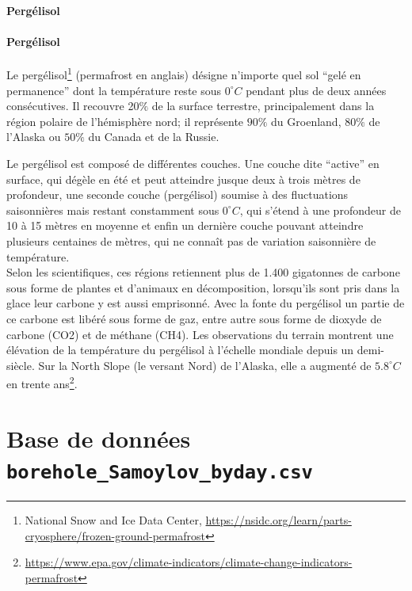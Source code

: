 \documentclass[a4paper,12pt]{article}
\theoremstyle{exercice}
\newcommand{\feuille}[2]{

\begin{bfseries}
\noindent Pergélisol \hfill   \\
 \hfill \\[10pt]
\end{bfseries}


\vspace{0.2cm}

\hrule\vspace{\baselineskip}

 }
\begin{document}
\thispagestyle{empty}


\begin{center}
\Large{\textbf{Pergélisol}}
\end{center}


\vspace{1cm}



\paragraph{Pergélisol}
Le pergélisol\footnote{National Snow and Ice Data Center, \url{https://nsidc.org/learn/parts-cryosphere/frozen-ground-permafrost} } (permafrost en anglais) désigne n'importe quel sol ``gelé en permanence'' dont la température reste sous $0^{\circ}C$ pendant plus de deux années consécutives. Il recouvre 20$\%$ de la surface terrestre, principalement  dans la région polaire de  l'hémisphère nord; il représente $90\%$ du Groenland, $80\%$ de l'Alaska ou $50\%$ du Canada et de la Russie.

Le pergélisol est composé de différentes couches. Une couche dite ``active'' en surface, qui dégèle en été et peut atteindre jusque deux à trois mètres de profondeur,  une seconde couche (pergélisol) soumise à des fluctuations saisonnières mais restant constamment sous $0^{\circ}C$, qui s'étend à une profondeur de 10 à 15 mètres en moyenne  et enfin un dernière couche pouvant atteindre plusieurs centaines de mètres, qui ne connaît pas de variation saisonnière de température.\\


 Selon les scientifiques, ces régions retiennent plus de 1.400 gigatonnes de carbone sous forme de plantes et d'animaux en décomposition, lorsqu'ils sont pris dans la glace leur carbone y est aussi emprisonné.  Avec la fonte du pergélisol un partie de ce carbone est libéré sous forme de gaz, entre autre sous forme de dioxyde de carbone (CO2) et de méthane (CH4).  Les observations du terrain montrent une élévation de la température du pergélisol à l’échelle mondiale depuis un demi-siècle. Sur la North Slope (le versant Nord) de l’Alaska, elle a augmenté de $5.8^{\circ}C$ en trente ans\footnote{\url{https://www.epa.gov/climate-indicators/climate-change-indicators-permafrost}}.


\section{Base de données \texttt{borehole\_Samoylov\_byday.csv}}
\end{document}
